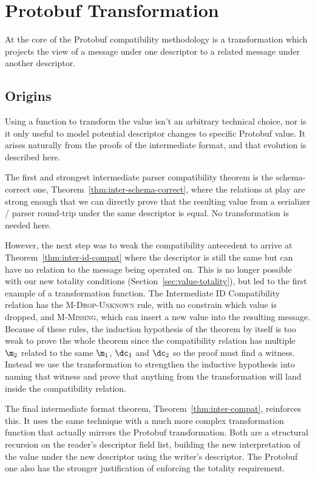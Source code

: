 \section{Protobuf Transformation}\label{sec:proto-transform}

At the core of the Protobuf compatibility methodology is a transformation which
projects the view of a message under one descriptor to a related message under
another descriptor.

\subsection{Origins}

Using a function to transform the value isn't an arbitrary technical choice, nor
is it only useful to model potential descriptor changes to specific Protobuf
value. It arises naturally from the proofs of the intermediate format, and that
evolution is described here.

The first and strongest intermediate parser compatibility theorem is the
schema-correct one, Theorem~\ref{thm:inter-schema-correct}, where the relations
at play are strong enough that we can directly prove that the resulting value
from a serializer / parser round-trip under the same descriptor is equal. No
transformation is needed here.

However, the next step was to weak the compatibility antecedent to arrive at
Theorem~\ref{thm:inter-id-compat} where the descriptor is still the same but can
have no relation to the message being operated on. This is no longer possible
with our new totality conditions (Section~\ref{sec:value-totality}), but led to
the first example of a transformation function. The Intermediate ID
Compatibility relation has the \textsc{M-Drop-Unknown} rule, with no constrain
which value is dropped, and \textsc{M-Missing}, which can insert a new value
into the resulting message. Because of these rules, the induction hypothesis of
the theorem by itself is too weak to prove the whole theorem since the
compatibility relation has multiple $\m_2$ related to the same $\m_1$, $\dc_1$ and
$\dc_2$ so the proof must find a witness. Instead we use the transformation to
strengthen the inductive hypothesis into naming that witness and prove that
anything from the transformation will land inside the compatibility relation.

The final intermediate format theorem, Theorem~\ref{thm:inter-compat},
reinforces this. It uses the same technique with a much more complex
transformation function that actually mirrors the Protobuf transformation. Both
are a structural recursion on the reader's descriptor field list, building the
new interpretation of the value under the new descriptor using the writer's
descriptor. The Protobuf one also has the stronger justification of enforcing
the totality requirement.

